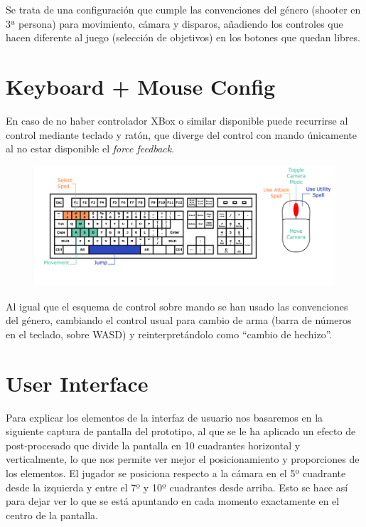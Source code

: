 \documentclass[12pt]{report}
\begin{document}
Se trata de una configuración que cumple las convenciones del género (shooter en 3ª persona) para movimiento, cámara y disparos, añadiendo los controles que hacen diferente al juego (selección de objetivos) en los botones que quedan libres.

\section{Keyboard + Mouse Config}
\label{control2}

En caso de no haber controlador XBox o similar disponible puede recurrirse al control mediante teclado y ratón, que diverge del control con mando únicamente al no estar disponible el \textit{force feedback}.

\begin{figure}[h]
    \centering
    \includegraphics[width=\textwidth]{keyboard}
\end{figure}

Al igual que el esquema de control sobre mando se han usado las convenciones del género, cambiando el control usual para cambio de arma (barra de números en el teclado, sobre WASD) y reinterpretándolo como ``cambio de hechizo''.

\section{User Interface}

Para explicar los elementos de la interfaz de usuario nos basaremos en la siguiente captura de pantalla del prototipo, al que se le ha aplicado un efecto de post-procesado que divide la pantalla en 10 cuadrantes horizontal y verticalmente, lo que nos permite ver mejor el posicionamiento y proporciones de los elementos. El jugador se posiciona respecto a la cámara en el 5º cuadrante desde la izquierda y entre el 7º y 10º cuadrantes desde arriba. Esto se hace así para dejar ver lo que se está apuntando en cada momento exactamente en el centro de la pantalla.
\end{document}
